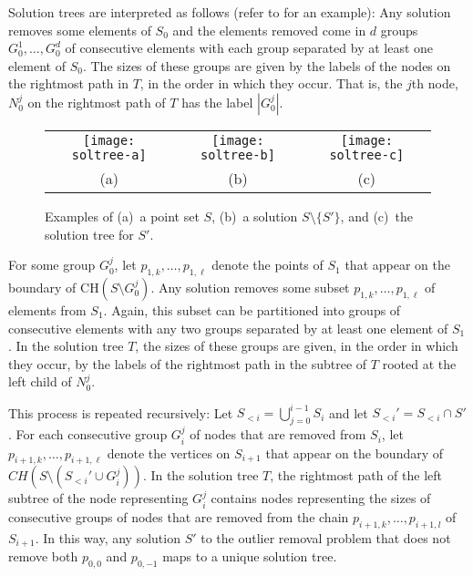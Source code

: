 \documentclass[lotsofwhite]{patmorin}
\newcommand{\ch}{\mathrm{CH}}
\begin{document}
Solution trees are interpreted as follows (refer to
 for an example): Any solution removes some
elements of $S_0$ and the elements removed come in $d$ groups
$G_0^1,\ldots,G_0^d$ of consecutive elements with each group separated
by at least one element of $S_0$.  The sizes of these groups are given
by the labels of the nodes on the rightmost path in $T$, in the order
in which they occur.  That is, the $j$th node, $N_0^j$ on the
rightmost path of $T$ has the label $|G_0^j|$. 

\begin{figure}
\begin{center}
\begin{tabular}{ccc}
\texttt{[image: soltree-a]} & 
\texttt{[image: soltree-b]} &
\texttt{[image: soltree-c]} \\
(a) & (b) & (c)
\end{tabular}
\end{center}
\caption{Examples of (a)~a point set $S$, (b)~a solution
$S\setminus\{S'\}$, and (c)~the solution tree for $S'$.}
\end{figure}

For some group $G_0^j$, let $p_{1,k}, \ldots, p_{1,\ell}$ denote the
points of $S_1$ that appear on the boundary of $\ch(S\setminus
G_0^j)$.  Any solution removes some subset $p_{1,k},\ldots,
p_{1,\ell}$ of elements from $S_1$.  Again, this subset can be
partitioned into groups of consecutive elements with any two groups
separated by at least one element of $S_1$.  In the solution tree $T$,
the sizes of these groups are given, in the order in which they occur,
by the labels of the rightmost path in the subtree of $T$ rooted at
the left child of $N_0^j$.

This process is repeated recursively: Let
$S_{<i}=\bigcup_{j=0}^{i-1}S_i$ and let $S_{<i}'=S_{<i}\cap S'$.  For
each consecutive group $G_i^j$ of nodes that are removed from $S_i$,
let $p_{i+1,k}, \ldots, p_{i+1,\ell}$ denote the vertices on $S_{i+1}$
that appear on the boundary of $CH(S \setminus (S_{<i}'\cup G_i^j))$.
In the solution tree $T$, the rightmost path of the left subtree of
the node representing $G_i^j$ contains nodes representing the sizes of
consecutive groups of nodes that are removed from the chain
$p_{i+1,k}, \ldots, p_{i+1,l}$ of $S_{i+1}$.  In this way, any
solution $S'$ to the outlier removal problem that does not remove both
$p_{0,0}$ and $p_{0,-1}$ maps to a unique solution tree.

\end{document}
